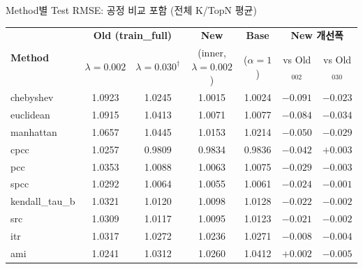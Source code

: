 \documentclass[aspectratio=169,10pt]{beamer}
\begin{document}
\begin{frame}[shrink=55]{Method별 Test RMSE: 공정 비교 포함 (전체 K/TopN 평균)}
	\begin{center}
	\renewcommand{\arraystretch}{1.15}
	\begin{tabular}{l|cc|c|c|cc}
		\toprule
		\multirow{2}{*}{\textbf{Method}}
		  & \multicolumn{2}{c|}{\textbf{Old (train\_full)}}
		  & \textbf{New}
		  & \textbf{Base}
		  & \multicolumn{2}{c}{\textbf{New 개선폭}} \\
		  & $\lambda{=}0.002$ & $\lambda{=}0.030^{\dagger}$
		  & \small(inner, $\lambda{=}0.002$)
		  & \small($\alpha{=}1$)
		  & vs Old$_{002}$ & vs Old$_{030}$ \\
		\midrule
		chebyshev      & 1.0923 & 1.0245 & \textcolor{testgreen}{1.0015} & 1.0024 & \textcolor{testgreen}{$-0.091$} & \textcolor{testgreen}{$-0.023$} \\
		euclidean      & 1.0915 & 1.0413 & \textcolor{testgreen}{1.0071} & 1.0077 & \textcolor{testgreen}{$-0.084$} & \textcolor{testgreen}{$-0.034$} \\
		manhattan      & 1.0657 & 1.0445 & \textcolor{testgreen}{1.0153} & 1.0214 & \textcolor{testgreen}{$-0.050$} & \textcolor{testgreen}{$-0.029$} \\
		cpcc           & 1.0257 & 0.9809 & \textcolor{testgreen}{0.9834} & 0.9836 & \textcolor{testgreen}{$-0.042$} & \textcolor{negred}{$+0.003$} \\
		pcc            & 1.0353 & 1.0088 & \textcolor{testgreen}{1.0063} & 1.0075 & \textcolor{testgreen}{$-0.029$} & \textcolor{testgreen}{$-0.003$} \\
		spcc           & 1.0292 & 1.0064 & \textcolor{testgreen}{1.0055} & 1.0061 & \textcolor{testgreen}{$-0.024$} & \textcolor{testgreen}{$-0.001$} \\
		kendall\_tau\_b& 1.0321 & 1.0120 & \textcolor{testgreen}{1.0098} & 1.0128 & \textcolor{testgreen}{$-0.022$} & \textcolor{testgreen}{$-0.002$} \\
		src            & 1.0309 & 1.0117 & \textcolor{testgreen}{1.0095} & 1.0123 & \textcolor{testgreen}{$-0.021$} & \textcolor{testgreen}{$-0.002$} \\
		itr            & 1.0317 & 1.0272 & \textcolor{testgreen}{1.0236} & 1.0271 & \textcolor{testgreen}{$-0.008$} & \textcolor{testgreen}{$-0.004$} \\
		ami            & 1.0241 & 1.0312 & 1.0260 & 1.0412 & \textcolor{negred}{$+0.002$} & \textcolor{testgreen}{$-0.005$} \\

\end{tabular}
\end{center}
\end{frame}
\end{document}
